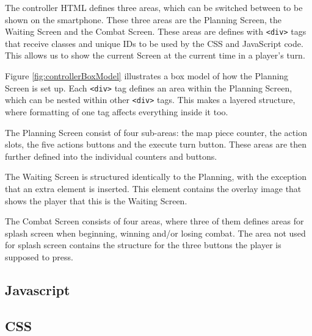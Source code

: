 The controller HTML defines three areas, which can be switched between to be shown on the smartphone. These three areas are the Planning Screen, the Waiting Screen and the Combat Screen. These areas are defines with \texttt{<div>} tags that receive classes and unique IDs to be used by the CSS and JavaScript code. This allows us to show the current Screen at the current time in a player's turn.

Figure \ref{fig:controllerBoxModel} illustrates a box model of how the Planning Screen is set up. Each \texttt{<div>} tag defines an area within the Planning Screen, which can be nested within other \texttt{<div>} tags. This makes a layered structure, where formatting of one tag affects everything inside it too.

The Planning Screen consist of four sub-areas: the map piece counter, the action slots, the five actions buttons and the execute turn button. These areas are then further defined into the individual counters and buttons.

The Waiting Screen is structured identically to the Planning, with the exception that an extra element is inserted. This element contains the overlay image that shows the player that this is the Waiting Screen.

The Combat Screen consists of four areas, where three of them defines areas for splash screen when beginning, winning and/or losing combat. The area not used for splash screen contains the structure for the three buttons the player is supposed to press.

\subsection{Javascript}\label{controllerJavascript}


\subsection{CSS}\label{controllerCSS}

